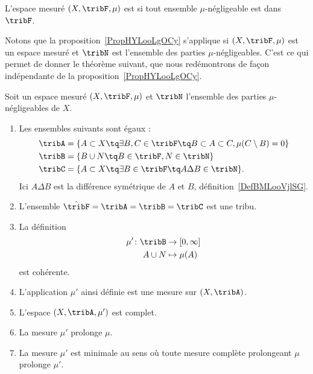 \begin{definition}  \label{DefBWAoomQZcI}
    L'espace mesuré \( (X,\tribF,\mu)\) est  si tout ensemble \( \mu\)-négligeable est dans \( \tribF\).
\end{definition}

Notons que la proposition~\ref{PropHYLooLgOCy} s'applique si \( (X,\tribF,\mu)\) est un espace mesuré et \( \tribN\) est l'ensemble des parties \( \mu\)-négligeables. C'est ce qui permet de donner le théorème suivant, que nous redémontrons de façon indépendante de la proposition~\ref{PropHYLooLgOCy}.
\begin{theorem}   \label{thoCRMootPojn}
    Soit un espace mesuré \( (X,\tribF,\mu)\) et \( \tribN\) l'ensemble des parties \( \mu\)-négligeables de \( X\).
    \begin{enumerate}
        \item
            Les ensembles suivants sont égaux :
            \begin{subequations}
                \begin{align}
                    \tribA  &=\{ A\subset X \tq \exists B,C\in\tribF \tq B\subset A\subset C,\mu(C\setminus B)=0 \}     \\
                    \tribB  &=\{ B\cup N \tq  B\in\tribF,N\in\tribN \}          \label{EqFJIoorxZNU}                    \\
                    \tribC  &=\{ A\subset X\tq \exists B\in\tribF\tq A\Delta B\in \tribN \}.
                \end{align}
            \end{subequations}
            Ici \( A\Delta B\) est la différence symétrique de \( A\) et \( B\), définition~\ref{DefBMLooVjlSG}.
        \item
            L'ensemble \( \hat\tribF=\tribA=\tribB=\tribC\) est une tribu.
        \item
            La définition
            \begin{equation}
                \begin{aligned}
                    \mu'\colon \tribB & \to \mathopen[ 0 , \infty \mathclose]   \\
                              A\cup N & \mapsto \mu(A)
                \end{aligned}
            \end{equation}
            est cohérente.
        \item
            L'application \( \mu'\) ainsi définie est une mesure sur \( (X,\tribA)\).
        \item
            L'espace \( (X,\tribA,\mu')\) est complet.
        \item
            La mesure \( \mu'\) prolonge \( \mu\).
        \item   \label{thoCRMootPojnvii}
            La mesure \( \mu'\) est minimale au sens où toute mesure complète prolongeant \( \mu\) prolonge \( \mu'\).
    \end{enumerate}
\end{theorem}


